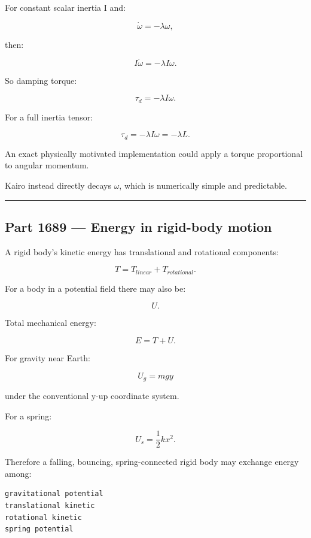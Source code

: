 \hypertarget{06-engine-ii-ch039-equivalent-damping-torque-in-simple-case}{}

For constant scalar inertia I and:

\[
\dot\omega=-\lambda\omega,
\]

then:

\[
I\dot\omega
=
-\lambda I\omega.
\]

So damping torque:

\[
\boxed{
\tau_d
=
-\lambda I\omega.
}
\]

For a full inertia tensor:

\[
\tau_d
=
-\lambda I\omega
=
-\lambda L.
\]

An exact physically motivated implementation could apply a torque proportional to angular momentum.

Kairo instead directly decays \(\omega\), which is numerically simple and predictable.

\begin{center}\rule{0.5\linewidth}{0.5pt}\end{center}

\subsection{Part 1689 --- Energy in rigid-body motion}\label{06-engine-ii-ch039-part-1689-energy-in-rigid-body-motion}

\hypertarget{06-engine-ii-ch039-part-1689-energy-in-rigid-body-motion}{}

A rigid body's kinetic energy has translational and rotational components:

\[
\boxed{
T
=
T_{linear}
+
T_{rotational}.
}
\]

For a body in a potential field there may also be:

\[
U.
\]

Total mechanical energy:

\[
\boxed{
E=T+U.
}
\]

For gravity near Earth:

\[
U_g
=
mgy
\]

under the conventional y-up coordinate system.

For a spring:

\[
U_s
=
\frac12kx^2.
\]

Therefore a falling, bouncing, spring-connected rigid body may exchange energy among:

\begin{verbatim}
gravitational potential
translational kinetic
rotational kinetic
spring potential
\end{verbatim}

